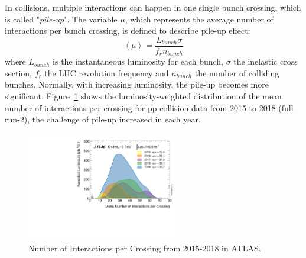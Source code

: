 In collisions, multiple interactions can happen in one single bunch crossing, which is called "\textit{pile-up}".
The variable $\mu$, which represents the average number of interactions per bunch crossing, 
is defined to describe pile-up effect:
\begin{equation}
	\left< \mu \right> = \frac{L_{bunch}\sigma}{f_{r}n_{bunch}}
\end{equation}
where $L_{bunch}$ is the instantaneous luminosity for each bunch, $\sigma$ the inelastic cross section,
$f_{r}$ the LHC revolution frequency and $n_{bunch}$ the number of colliding bunches.
Normally, with increasing luminosity, the pile-up becomes more significant.
Figure~\ref{fig:run2_mu} shows the luminosity-weighted distribution of the mean number of interactions per crossing
for pp collision data from 2015 to 2018 (full run-2), the challenge of pile-up increased in each year.
\begin{figure}[!htb]
  \centering
  \includegraphics[width=0.6\textwidth]{figures/Detector/mu_2015_2018.pdf}
  \caption{Number of Interactions per Crossing from 2015-2018 in ATLAS.}
  \label{fig:run2_mu}
\end{figure}
